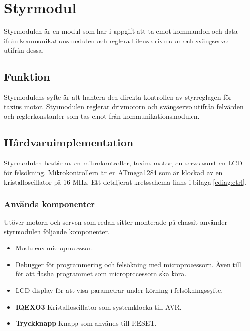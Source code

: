 \documentclass[tekniskrapport/tech.tex]{subfiles}
\begin{document}
\section{Styrmodul}
Styrmodulen är en modul som har i uppgift att ta emot kommandon och data ifrån
kommunikationsmodulen och reglera bilens drivmotor och svängservo utifrån
dessa.

\subsection{Funktion}
Styrmodulens syfte är att hantera den direkta kontrollen av styrreglagen för
taxins motor. Styrmodulen reglerar drivmotorn och svängservo utifrån
felvärden och reglerkonstanter som tas emot från kommunikationsmodulen.

\subsection{Hårdvaruimplementation}
Styrmodulen består av en mikrokontroller, taxins motor, en servo samt en LCD
för felsökning. Mikrokontrollern är en ATmega1284 som är klockad av en
kristalloscillator på 16 MHz. Ett detaljerat kretsschema finns i bilaga
\ref{cdiag:ctrl}.

\subsubsection{Använda komponenter}
Utöver motorn och servon som redan sitter monterade på chassit använder
styrmodulen följande komponenter.
\begin{itemize}
	\item \textbf{\modMicrocontroller} Modulens microprocessor. 
    \item \textbf{\modJtag} Debugger för programmering och felsökning med
        microprocessorn. Även till för att flasha programmet som
        microprocessorn ska köra.
    \item \textbf{\modLcd} LCD-display för att visa parametrar under körning i
        felsökningssyfte.
    \item \textbf{IQEXO3} Kristalloscillator som systemklocka till AVR.
    \item \textbf{Tryckknapp} Knapp som används till RESET.
\end{itemize}
\end{document}
